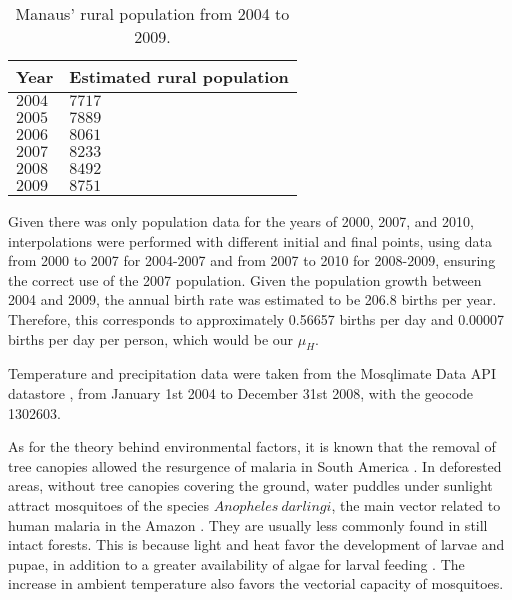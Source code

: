 \documentclass[a4paper,fleqn]{cas-dc}
\begin{document}
\begin{table}[width=.9\linewidth,cols=4,pos=h]
\caption{Manaus' rural population from 2004 to 2009.}\label{tbl1}
\begin{tabular*}{\tblwidth}{@{} LL@{} } %
\toprule
\textbf{Year}  & \textbf{Estimated rural population}\\
\midrule
$2004$ & $7717$ \\
 $2005$ & $7889$ \\
$2006$ & $8061$ \\
$2007$ & $8233$ \\
$2008$ & $8492$ \\
$2009$ & $8751$ \\
\bottomrule
\end{tabular*}
\end{table}


Given there was only population data for the years of 2000, 2007, and 2010, 
interpolations were performed with different initial and final 
points, using data from 2000 to 2007 for 2004-2007 and from 2007 
to 2010 for 2008-2009, ensuring the correct use of the 2007 population. 
Given the population growth between 2004 and 2009, the annual birth rate was 
estimated to be 206.8 births per year. Therefore, this corresponds 
to approximately 0.56657 births per day and 0.00007 births per day 
per person, which would be our $\mu_H$. 

Temperature and precipitation data were taken from the Mosqlimate Data API datastore \cite{MosqlimateAPI}, from January 1st 2004 to December 31st 2008, with the geocode 1302603.

As for the theory behind environmental factors, it is known that the removal of tree canopies allowed 
the resurgence of malaria in South America \cite{Norris2004}. In deforested areas, 
without tree canopies covering the ground, water puddles under sunlight 
attract mosquitoes of the species $Anopheles \ darlingi$, the main vector 
related to human malaria in the Amazon \cite{infoAnopheles}. They are 
usually less commonly found in still intact forests. This is 
because light and heat favor the development of larvae and 
pupae, in addition to a greater availability of algae for 
larval feeding \cite{article_alteracoesambientais}. The increase 
in ambient temperature also favors the vectorial capacity of 
mosquitoes. 
\end{document}
